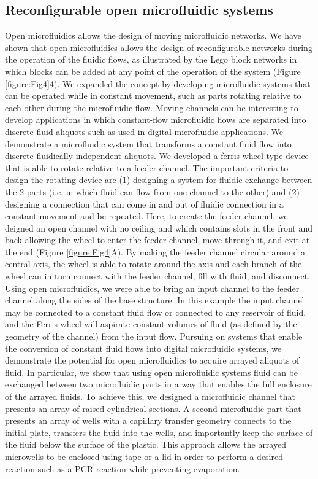 \subsection{Reconfigurable open microfluidic systems}
Open microfluidics allows the design of moving microfluidic networks. We have shown that open microfluidics allows the design of reconfigurable networks during the operation of the fluidic flows, as illustrated by the Lego block networks in which blocks can be added at any point of the operation of the system (Figure \ref{figure:Fig4}4). We expanded the concept by developing microfluidic systems that can be operated while in constant movement, such as parts rotating relative to each other during the microfluidic flow. Moving channels can be interesting to develop applications in which constant-flow microfluidic flows are separated into discrete fluid aliquots such as used in digital microfluidic applications. 
We demonstrate a microfluidic system that transforms a constant fluid flow into discrete fluidically independent aliquots. We developed a ferris-wheel type device that is able to rotate relative to a feeder channel. The important criteria to design the rotating device are (1) designing a system for fluidic exchange between the 2 parts (i.e. in which fluid can flow from one channel to the other) and (2) designing a connection that can come in and out of fluidic connection in a constant movement and be repeated. Here, to create the feeder channel, we deigned an open channel with no ceiling and which contains slots in the front and back allowing the wheel to enter the feeder channel, move through it, and exit at the end (Figure \ref{figure:Fig4}A). By making the feeder channel circular around a central axis, the wheel is able to rotate around the axis and each branch of the wheel can in turn connect with the feeder channel, fill with fluid, and disconnect. Using open microfluidics, we were able to bring an input channel to the feeder channel along the sides of the base structure. In this example the input channel may be connected to a constant fluid flow or connected to any reservoir of fluid, and the Ferris wheel will aspirate constant volumes of fluid (as defined by the geometry of the channel) from the input flow. 
Pursuing on systems that enable the conversion of constant fluid flows into digital microfluidic systems, we demonstrate the potential for open microfluidics to acquire arrayed aliquots of fluid. In particular, we show that using open microfluidic systems fluid can be exchanged between two microfluidic parts in a way that enables the full enclosure of the arrayed fluids. To achieve this, we designed a microfluidic channel that presents an array of raised cylindrical sections. A second microfluidic part that presents an array of wells with a capillary transfer geometry connects to the initial plate, transfers the fluid into the wells, and importantly keep the surface of the fluid below the surface of the plastic. This approach allows the arrayed microwells to be enclosed using tape or a lid in order to perform a desired reaction such as a PCR reaction while preventing evaporation. 

